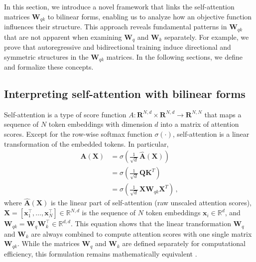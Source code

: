 %
In this section, we introduce a novel framework that links the self-attention matrices $\bm{W}_{qk}$ to bilinear forms, enabling us to analyze how an objective function influences their structure.
%
This approach reveals fundamental patterns in $\bm{W}_{qk}$  that are not apparent when examining $\bm{W}_q$ and $\bm{W}_k$ separately.  
%
For example, we prove that autoregressive and bidirectional training induce directional and symmetric structures in the $\bm{W}_{qk}$ matrices.
%
In the following sections, we define and formalize these concepts.
%






\subsection{Interpreting self-attention with bilinear forms}
\label{sec:self-attention-bilinear-form}
%
Self-attention \citep{vaswaniAttentionAllYou2017,radfordLanguageModelsAre2019} is 
a type of score function $A: \mathbf{R}^{N,d} \times \mathbf{R}^{N,d} \rightarrow \mathbf{R}^{N,N}$ that maps a sequence of $N$ token embeddings with dimension $d$ into a matrix of attention scores.
%
Except for the row-wise softmax function $\sigma(\cdot)$, self-attention is a linear transformation of the embedded tokens.
%
In particular, 
%
\begin{equation}
\label{eq:results:self-attention-bilinear-form}
\begin{split}
    \bm{A}(\bm{X}) 
    & = \sigma\left(\frac{1}{\sqrt{d}}\,\hat{\bm{A}}(\bm{X})\right) \\
    & = \sigma\left(\frac{1}{\sqrt{d}}\,\bm{Q} \bm{K}^T\right) \\
    & = \sigma\left(\frac{1}{\sqrt{d}}\,\bm{X} \bm{W}_{qk}\bm{X}^T\right) \,,
\end{split}
\end{equation}
where $\hat{\bm{A}}(\bm{X})$ is the linear part of self-attention (raw unscaled attention scores), $\bm{X} = [\bm{x}^\top_1, \dots, \bm{x}^\top_N] \in \mathbb{R}^{N,d} $ is the sequence of $N$ token embeddings $\bm{x}_i \in \mathbb{R}^d$,  and $\bm{W}_{qk} = \bm{W}_q\bm{W}_k^\top \in \mathbb{R}^{d,d}$.
%
This equation shows that the linear transformation $\bm{W}_q$ and $\bm{W}_k$ are always combined to compute attention scores with one single matrix $\bm{W}_{qk}$.
%
While the matrices $\bm{W}_q$ and $\bm{W}_k$ are defined separately for computational efficiency, this formulation remains mathematically equivalent \citep[see also][]{elhageMathematicalFrameworkTransformer2021, olssonIncontextLearningInduction2022,darAnalyzingTransformersEmbedding2023}.
%

